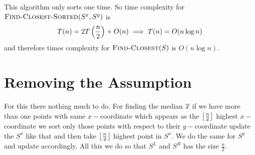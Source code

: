 This algorithm only sorts one time. So time complexity for $\textsc{Find-Closest-Sorted}(S^x,S^y)$ is $$T(n)=2T\left(\frac{n}{2}\right)+O(n)\implies T(n)=O(n\log n)$$and therefore times complexity for $\textsc{Find-Closest}(S)$ is $O(n\log n)$.

\section{Removing the Assumption}
For this there nothing much to do. For finding the median $\overline{x}$ if we have more than one points with same $x-$coordinate which appears as the $\left\lfloor \frac{n}{2}\right\rfloor$ highest $x-$coordinate we sort only those points with respect to their $y-$coordinate update the $S^x$ like that and then take $\left\lfloor \frac{n}{2}\right\rfloor$ highest point in $S^x$. We do the same for $S^y$ and update accordingly. All this we do so that $S^L$ and $S^R$ has the size $\frac{n}{2}$.
